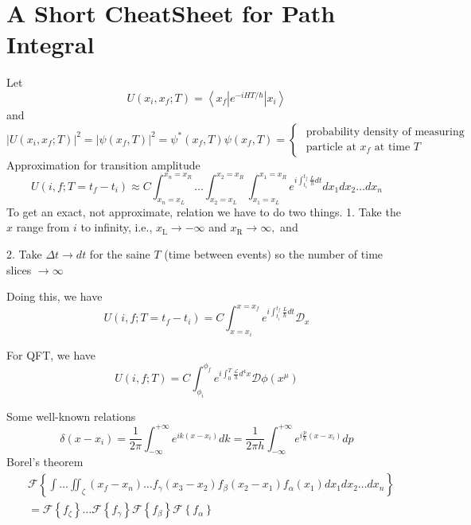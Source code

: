 \chapter{A Short CheatSheet for Path Integral}
Let
\begin{equation}U\left(x_{i}, x_{f} ; T\right)=\left\langle x_{f}\left|e^{-i H T / \hbar}\right| x_{i}\right\rangle\end{equation}
and
\begin{equation}\left|U\left(x_{i}, x_{f} ; T\right)\right|^{2}=\left|\psi\left(x_{f}, T\right)\right|^{2}=\psi^{*}\left(x_{f}, T\right) \psi\left(x_{f}, T\right)=\left\{\begin{array}{c}
\text { probability density of measuring } \\
\text { particle at } x_{f} \text { at time } T
\end{array}\right.\end{equation}
Approximation for transition amplitude
\begin{equation}U\left(i, f ; T=t_{f}-t_{i}\right) \approx C \int_{x_{n}=x_{L}}^{x_{n}=x_{R}} \ldots \int_{x_{2}=x_{L}}^{x_{2}=x_{R}} \int_{x_{1}=x_{L}}^{x_{1}=x_{R}} e^{i \int_{t_{i}}^{t_f} \frac{L}{h} d t} d x_{1} d x_{2} \ldots d x_{n}\end{equation}
To get an exact, not approximate, relation we have to do two things.
1. Take the $x$ range from $i$ to infinity, i.e., $x_{\mathrm{L}} \rightarrow-\infty$ and $x_{\mathrm{R}} \rightarrow \infty,$ and

2. Take $\Delta t \rightarrow d t$ for the saine $T$ (time between events) so the number of time slices $\rightarrow \infty$

Doing this, we have
\begin{equation}U\left(i, f ; T=t_{f}-t_{i}\right)=C \int_{x= x_{i}}^{x=x_{f}} e^{i \int_{t_{i}}^{t_f} \frac{L}{\hbar} d t} \mathcal{D}_{x}\end{equation}

For QFT, we have
\begin{equation}U(i, f ; T)=C \int_{\phi_{i}}^{\phi_{f}} e^{i \int_{0}^{T} \frac{\mathcal{L}}{h} d^{4} x} \mathcal{D} \phi\left(x^{\mu}\right)\end{equation}

Some well-known relations
\begin{equation}\delta\left(x-x_{i}\right)=\frac{1}{2 \pi} \int_{-\infty}^{+\infty} e^{i k\left(x-x_{i}\right)} d k=\frac{1}{2 \pi h} \int_{-\infty}^{+\infty} e^{i \frac{p}{\hbar}\left(x-x_{i}\right)} d p\end{equation}
Borel's theorem
\begin{equation}\begin{aligned}
&\mathcal{F}\left\{\int \ldots \iint_{\zeta}\left(x_{f}-x_{n}\right) \ldots f_{\gamma}\left(x_{3}-x_{2}\right) f_{\beta}\left(x_{2}-x_{1}\right) f_{\alpha}\left(x_{1}\right) d x_{1} d x_{2} \ldots d x_{n}\right\} \\
&=\mathcal{F}\left\{f_{\zeta}\right\} \ldots \mathcal{F}\left\{f_{\gamma}\right\} \mathcal{F}\left\{f_{\beta}\right\} \mathcal{F}\left\{f_{\alpha}\right\}
\end{aligned}\end{equation}